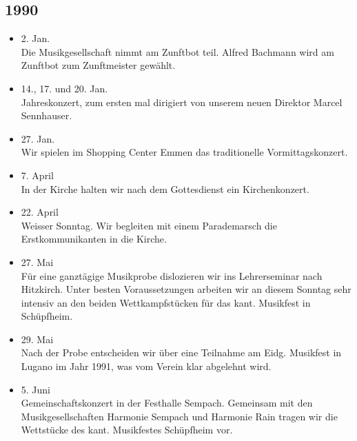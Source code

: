 \subsection*{1990}

\begin{history}


    \begin{itemize}

        \item 2. Jan.\\
              Die Musikgesellschaft nimmt am Zunftbot teil. Alfred Bachmann wird am
              Zunftbot zum Zunftmeister gewählt.

        \item 14., 17. und 20. Jan.\\
              Jahreskonzert, zum ersten mal dirigiert von unserem neuen Direktor
              Marcel Sennhauser.

        \item 27. Jan.\\
              Wir spielen im Shopping Center Emmen das traditionelle
              Vormittagskonzert.

        \item 7. April\\
              In der Kirche halten wir nach dem Gottesdienst ein Kirchenkonzert.

        \item 22. April\\
              Weisser Sonntag. Wir begleiten mit einem Parademarsch die
              Erstkommunikanten in die Kirche.

        \item 27. Mai\\
              Für eine ganztägige Musikprobe dislozieren wir ins Lehrerseminar nach
              Hitzkirch. Unter besten Voraussetzungen arbeiten wir an diesem Sonntag
              sehr intensiv an den beiden Wettkampfstücken für das kant. Musikfest in
              Schüpfheim.

        \item 29. Mai\\
              Nach der Probe entscheiden wir über eine Teilnahme am Eidg. Musikfest in
              Lugano im Jahr 1991, was vom Verein klar abgelehnt wird.

        \item 5. Juni\\
              Gemeinschaftskonzert in der Festhalle Sempach. Gemeinsam mit den
              Musikgesellschaften Harmonie Sempach und Harmonie Rain tragen wir die
              Wettstücke des kant. Musikfestes Schüpfheim vor.


\end{itemize}
\end{history}
